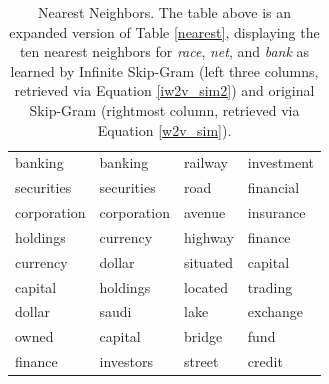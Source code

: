 \documentclass{article} %
\begin{document}
\begin{table}[]
\begin{tabular}{@{}lll | l@{}}
banking       & banking                       & railway               & investment   \\ 
securities    & securities                    & road                  & financial   \\ 
 corporation   & corporation                   & avenue                & insurance  \\ 
 holdings      & currency                      & highway               & finance   \\ 
currency      & dollar & situated              & capital  \\ 
capital       & holdings                      & located               & trading  \\ 
dollar        & saudi & lake                  & exchange  \\ 
owned         & capital                       & bridge                & fund   \\ 
finance       & investors                     & street                & credit  \\ 
\bottomrule
\end{tabular}
\caption{Nearest Neighbors.  The table above is an expanded version of Table \ref{nearest}, displaying the ten nearest neighbors for \textit{race}, \textit{net}, and \textit{bank} as learned by Infinite Skip-Gram (left three columns, retrieved via Equation \ref{iw2v_sim2}) and original Skip-Gram (rightmost column, retrieved via Equation \ref{w2v_sim}).}
\label{nearest_appendix}
\end{table}
\end{document}
